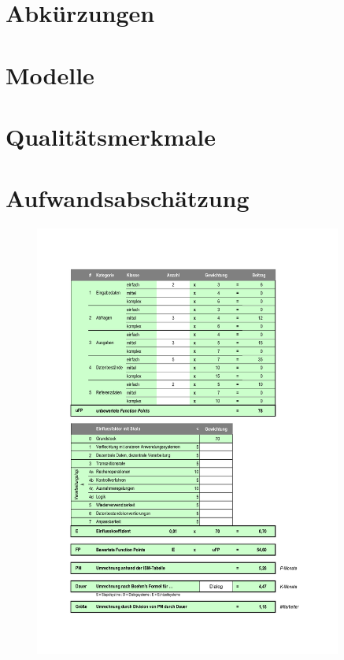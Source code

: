 \begin{appendix}
\begin{description}
	 
	\end{description}
  \section{Abkürzungen}
  \section{Modelle}
  \section{Qualitätsmerkmale}
  \clearpage
  \section{Aufwandsabschätzung}
  
  
  
  	\begin{figure}[ht]
	\centering
	\includegraphics[width=0.9\textwidth]{./files/Aufwand}
	\label{fig:Aufwand}
	\end{figure}

  \end{appendix}

			  
